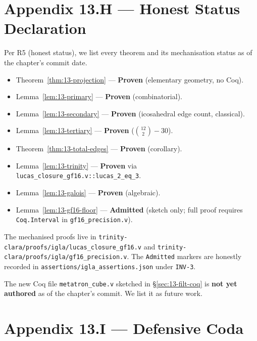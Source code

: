 \section*{Appendix 13.H --- Honest Status Declaration}
\label{sec:13-appH}

Per R5 (honest status), we list every theorem and its mechanisation
status as of the chapter's commit date.

\begin{itemize}
\item Theorem~\ref{thm:13-projection} --- \textbf{Proven}
  (elementary geometry, no Coq).
\item Lemma~\ref{lem:13-primary} --- \textbf{Proven} (combinatorial).
\item Lemma~\ref{lem:13-secondary} --- \textbf{Proven} (icosahedral
  edge count, classical).
\item Lemma~\ref{lem:13-tertiary} --- \textbf{Proven}
  ($\binom{12}{2} - 30$).
\item Theorem~\ref{thm:13-total-edges} --- \textbf{Proven}
  (corollary).
\item Lemma~\ref{lem:13-trinity} --- \textbf{Proven} via
  \verb|lucas_closure_gf16.v::lucas_2_eq_3|.
\item Lemma~\ref{lem:13-galois} --- \textbf{Proven} (algebraic).
\item Lemma~\ref{lem:13-gf16-floor} --- \textbf{Admitted} (sketch
  only; full proof requires \verb|Coq.Interval| in
  \verb|gf16_precision.v|).
\end{itemize}


The mechanised proofs live in
\verb|trinity-clara/proofs/igla/lucas_closure_gf16.v| and
\verb|trinity-clara/proofs/igla/gf16_precision.v|. The
\verb|Admitted| markers are honestly recorded in
\verb|assertions/igla_assertions.json| under \texttt{INV-3}.

The new Coq file \verb|metatron_cube.v| sketched in
\S\ref{sec:13-filt-coq} is \textbf{not yet authored} as of the
chapter's commit. We list it as future work.


\section*{Appendix 13.I --- Defensive Coda}
\label{fa_13:sec:13-appI}

